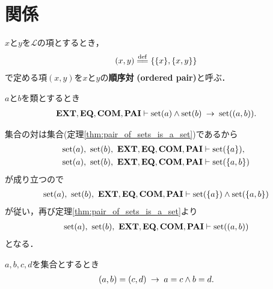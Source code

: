 \section{関係}
	\begin{screen}
		\begin{dfn}[順序対]
			$x$と$y$を$\mathcal{L}$の項とするとき，
			\begin{align}
				(x,y) \defeq \{\{x\},\{x,y\}\}
			\end{align}
			で定める項$(x,y)$を$x$と$y$の{\bf 順序対}
			{\bf (ordered pair)}と呼ぶ．
		\end{dfn}
	\end{screen}
	
	\begin{screen}
		\begin{thm}[集合の順序対は集合]
		\label{thm:ordered_pair_of_sets_is_a_set}
			$a$と$b$を類とするとき
			\begin{align}
				\mbox{{\bf EXT}},\mbox{{\bf EQ}},\mbox{\bf COM},\mbox{{\bf PAI}} \vdash
				\operatorname*{set} (a) \wedge \operatorname*{set} (b) \hspace{0.25em}\rightarrow\hspace{0.25em} \operatorname*{set} ((a,b)).
			\end{align}
		\end{thm}
	\end{screen}
	
	\begin{prf}
		集合の対は集合(定理\ref{thm:pair_of_sets_is_a_set})であるから
		\begin{align}
			\operatorname*{set} (a),\ \operatorname*{set} (b),\ \mbox{{\bf EXT}},\mbox{{\bf EQ}},\mbox{\bf COM},\mbox{{\bf PAI}} &\vdash \operatorname*{set} (\{a\}), \\
			\operatorname*{set} (a),\ \operatorname*{set} (b),\ \mbox{{\bf EXT}},\mbox{{\bf EQ}},\mbox{\bf COM},\mbox{{\bf PAI}} &\vdash \operatorname*{set} (\{a,b\})
		\end{align}
		が成り立つので
		\begin{align}
			\operatorname*{set} (a),\ \operatorname*{set} (b),\ \mbox{{\bf EXT}},\mbox{{\bf EQ}},\mbox{\bf COM},\mbox{{\bf PAI}} \vdash 
			\operatorname*{set} (\{a\}) \wedge \operatorname*{set} (\{a,b\})
		\end{align}
		が従い，再び定理\ref{thm:pair_of_sets_is_a_set}より
		\begin{align}
			\operatorname*{set} (a),\ \operatorname*{set} (b),\ \mbox{{\bf EXT}},\mbox{{\bf EQ}},\mbox{\bf COM},\mbox{{\bf PAI}} \vdash \operatorname*{set} ((a,b))
		\end{align}
		となる．
		\QED
	\end{prf}
	
	\begin{screen}
		\begin{thm}[順序対の相等性]
		\label{thm:equality_of_ordered_pairs}
			$a,b,c,d$を集合とするとき
			\begin{align}
				(a,b) = (c,d) \hspace{0.25em}\rightarrow\hspace{0.25em} a=c \wedge b=d.
			\end{align}
		\end{thm}
	\end{screen}
	

